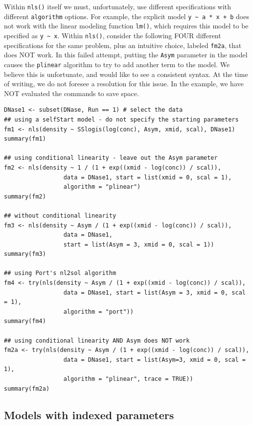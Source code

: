 Within \texttt{nls()} itself we must, unfortunately, use
different specifications with different \texttt{algorithm} options.
For example, the explicit model \texttt{y\ \textasciitilde{}\ a\ *\ x\ +\ b} does not work with the linear
modeling function \texttt{lm()}, which requires this model to be specified as \texttt{y\ \textasciitilde{}\ x}.
Within \texttt{nls()}, consider the following FOUR different specifications for the same
problem, plus an intuitive choice, labeled \texttt{fm2a}, that does NOT work.
In this failed attempt, putting the \texttt{Asym} parameter in the model causes the
\texttt{plinear} algorithm
to try to add another term to the model. We believe this is unfortunate, and would
like to see a consistent syntax. At the time of writing, we do
not foresee a resolution for this issue. In the example, we have NOT evaluated
the commands to save space.

\begin{verbatim}
DNase1 <- subset(DNase, Run == 1) # select the data
## using a selfStart model - do not specify the starting parameters
fm1 <- nls(density ~ SSlogis(log(conc), Asym, xmid, scal), DNase1)
summary(fm1)

## using conditional linearity - leave out the Asym parameter
fm2 <- nls(density ~ 1 / (1 + exp((xmid - log(conc)) / scal)),
                 data = DNase1, start = list(xmid = 0, scal = 1),
                 algorithm = "plinear")
summary(fm2)

## without conditional linearity
fm3 <- nls(density ~ Asym / (1 + exp((xmid - log(conc)) / scal)),
                 data = DNase1,
                 start = list(Asym = 3, xmid = 0, scal = 1))
summary(fm3)

## using Port's nl2sol algorithm
fm4 <- try(nls(density ~ Asym / (1 + exp((xmid - log(conc)) / scal)),
                 data = DNase1, start = list(Asym = 3, xmid = 0, scal = 1),
                 algorithm = "port"))
summary(fm4)

## using conditional linearity AND Asym does NOT work
fm2a <- try(nls(density ~ Asym / (1 + exp((xmid - log(conc)) / scal)), 
                 data = DNase1, start = list(Asym=3, xmid = 0, scal = 1),
                 algorithm = "plinear", trace = TRUE))
summary(fm2a)
\end{verbatim}

\subsection{Models with indexed parameters}\label{models-with-indexed-parameters}


